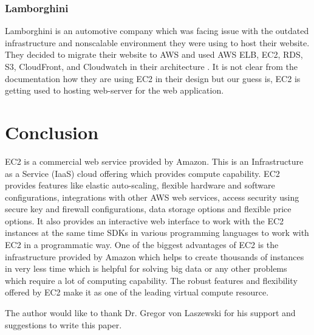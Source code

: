 \subsubsection{Lamborghini}
Lamborghini is an automotive company which was facing issue with the outdated infrastructure and nonscalable environment they were using to host their website. They decided to migrate their website to AWS and used AWS ELB, EC2, RDS, S3, CloudFront, and Cloudwatch in their architecture \cite{www-aws-ec2-lamborghini}. It is not clear from the documentation how they are using EC2 in their design but our guess is, EC2 is getting used to hosting web-server for the web application.

\section{Conclusion}
EC2 is a commercial web service provided by Amazon. This is an Infrastructure as a Service (IaaS) cloud offering which provides compute capability. EC2 provides features like elastic auto-scaling, flexible hardware and software configurations, integrations with other AWS web services, access security using secure key and firewall configurations, data storage options and flexible price options. It also provides an interactive web interface to work with the EC2 instances at the same time SDKs in various programming languages to work with EC2 in a programmatic way. One of the biggest advantages of EC2 is the infrastructure provided by Amazon which helps to create thousands of instances in very less time which is helpful for solving big data or any other problems which require a lot of computing capability. The robust features and flexibility offered by EC2 make it as one of the leading virtual compute resource.

\begin{acks}

  The author would like to thank Dr. Gregor von Laszewski for his
  support and suggestions to write this paper.

\end{acks}


 
